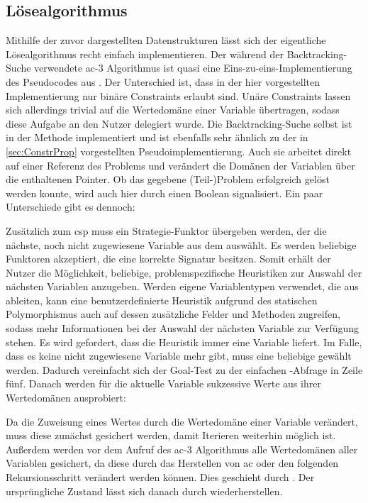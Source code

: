 \subsection{Lösealgorithmus}
Mithilfe der zuvor dargestellten Datenstrukturen lässt sich der eigentliche Lösealgorithmus recht einfach implementieren. Der während der Backtracking-Suche verwendete \ac*{ac}-3
Algorithmus ist quasi eine Eins-zu-eins-Implementierung des Pseudocodes aus \cite{ac3}. Der Unterschied ist, dass in der hier vorgestellten Implementierung nur binäre Constraints
erlaubt sind. Unäre Constraints lassen sich allerdings trivial auf die Wertedomäne einer Variable übertragen, sodass diese Aufgabe an den Nutzer delegiert wurde.
Die Backtracking-Suche selbst ist in der Methode  implementiert und ist ebenfalls sehr ähnlich zu der in \cref{sec:ConstrProp} vorgestellten
Pseudoimplementierung. Auch sie arbeitet direkt auf einer Referenz des Problems und verändert die Domänen der Variablen über die enthaltenen Pointer. Ob das gegebene
(Teil-)Problem erfolgreich gelöst werden konnte, wird auch hier durch einen Boolean signalisiert. Ein paar Unterschiede gibt es dennoch:

Zusätzlich zum \ac*{csp} muss ein Strategie-Funktor übergeben werden, der die nächste, noch nicht zugewiesene Variable aus dem  auswählt. Es werden beliebige
Funktoren akzeptiert, die eine korrekte Signatur besitzen. Somit erhält der Nutzer die Möglichkeit, beliebige, problemspezifische Heuristiken zur Auswahl der nächsten Variablen
anzugeben. Werden eigene Variablentypen verwendet, die aus  ableiten, kann eine benutzerdefinierte Heuristik aufgrund des statischen Polymorphismus auch auf
dessen zusätzliche Felder und Methoden zugreifen, sodass mehr Informationen bei der Auswahl der nächsten Variable zur Verfügung stehen. Es wird gefordert, dass die Heuristik
immer eine Variable liefert. Im Falle, dass es keine nicht zugewiesene Variable mehr gibt, muss eine beliebige gewählt werden. Dadurch vereinfacht sich der Goal-Test zu der
einfachen -Abfrage in Zeile fünf. Danach werden für die aktuelle Variable sukzessive Werte aus ihrer Wertedomänen ausprobiert:

Da die Zuweisung eines Wertes durch  die Wertedomäne einer Variable verändert, muss diese zunächst gesichert werden, damit Iterieren weiterhin möglich ist.
Außerdem werden vor dem Aufruf des \ac*{ac}-3 Algorithmus alle Wertedomänen aller Variablen gesichert, da diese durch das Herstellen von \ac*{ac} oder den folgenden
Rekursionsschritt verändert werden können. Dies geschieht durch . Der ursprüngliche Zustand lässt sich danach durch
 wiederherstellen.

